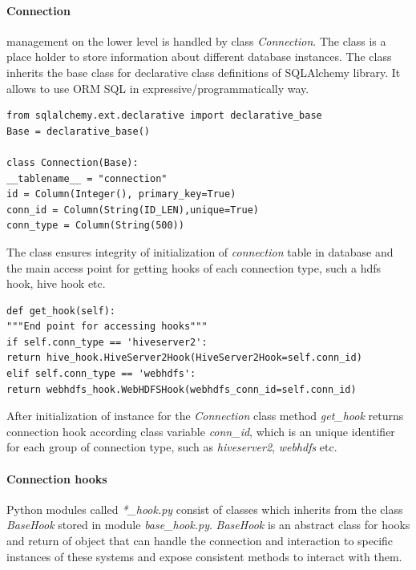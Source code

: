 \documentclass[a4paper,12pt,oneside]{report}
\begin{document}
	\paragraph{Connection} management on the  lower level is handled by  class
	\textit{Connection}. The class is a place holder to store information about
	different database instances. The class inherits the base class for declarative
	class definitions of SQLAlchemy library. 
	It allows to use ORM SQL in expressive/programmatically way.  
	\begin{footnotesize}
		\begin{lstlisting}[style=python]
from sqlalchemy.ext.declarative import declarative_base
Base = declarative_base()

class Connection(Base):
__tablename__ = "connection"
id = Column(Integer(), primary_key=True)
conn_id = Column(String(ID_LEN),unique=True)
conn_type = Column(String(500))
		\end{lstlisting}
	\end{footnotesize}
	The class ensures integrity of initialization of \textit{connection} table in
	database and the main access point for getting hooks of each connection type,
	such a hdfs hook, hive hook etc. 
	\begin{footnotesize}
		\begin{lstlisting}[style=python]
def get_hook(self):
"""End point for accessing hooks"""
if self.conn_type == 'hiveserver2':
return hive_hook.HiveServer2Hook(HiveServer2Hook=self.conn_id)
elif self.conn_type == 'webhdfs':
return webhdfs_hook.WebHDFSHook(webhdfs_conn_id=self.conn_id)
		\end{lstlisting}
	\end{footnotesize}
	After initialization of instance for the \textit{Connection} class method
	\textit{get\_hook} returns connection hook according class variable
	\textit{conn\_id}, which is an unique identifier for each group of connection
	type, such as \textit{hiveserver2}, \textit{webhdfs} etc.
	
	\paragraph{Connection hooks}
	Python modules called \textit{*\_hook.py} consist of classes which inherits from
	the class \textit{BaseHook} stored in module \textit{base\_hook.py}.
	\textit{BaseHook} is an abstract class for hooks and return of object that can
	handle the connection and interaction to specific instances of these systems
	and expose consistent methods to interact with them.
	
\end{document}
